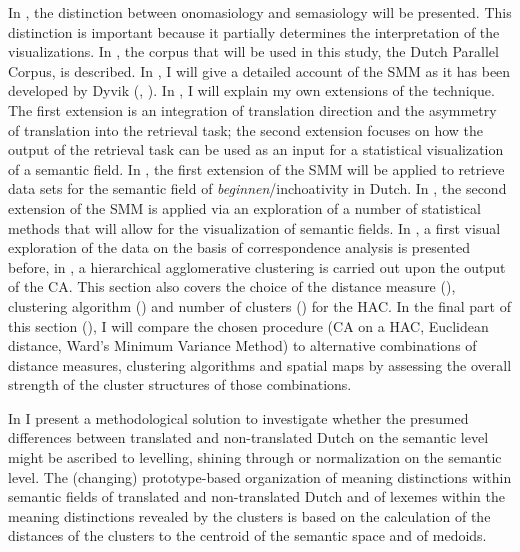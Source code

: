 In , the distinction between onomasiology and semasiology will be presented. This distinction is important because it partially determines the interpretation of the visualizations. In , the corpus that will be used in this study, the Dutch Parallel Corpus, is described. In , I will give a detailed account of the SMM as it has been developed by Dyvik (\citep{johansson_translational_1998}, \citep{langemets_translations_2005}). In , I will explain my own extensions of the technique. The first extension is an integration of translation direction and the asymmetry of translation into the retrieval task; the second extension focuses on how the output of the retrieval task can be used as an input for a statistical visualization of a semantic field. In , the first extension of the SMM will be applied to retrieve data sets for the semantic field of \textit{beginnen}/inchoativity in Dutch. In , the second extension of the SMM is applied via an exploration of a number of statistical methods that will allow for the visualization of semantic fields. In , a first visual exploration of the data on the basis of correspondence analysis is presented before, in , a hierarchical agglomerative clustering is carried out upon the output of the CA. This section also covers the choice of the distance measure (), clustering algorithm () and number of clusters () for the HAC. In the final part of this section (), I will compare the chosen procedure (CA on a HAC, Euclidean distance, Ward’s Minimum Variance Method) to alternative combinations of distance measures, clustering algorithms and spatial maps by assessing the overall strength of the cluster structures of those combinations.

In  I present a methodological solution to investigate whether the presumed differences between translated and non-translated Dutch on the semantic level might be ascribed to levelling, shining through or normalization on the semantic level. The (changing) prototype-based organization of meaning distinctions within semantic fields of translated and non-translated Dutch and of lexemes within the meaning distinctions revealed by the clusters is based on the calculation of the distances of the clusters to the centroid of the semantic space and of medoids.

